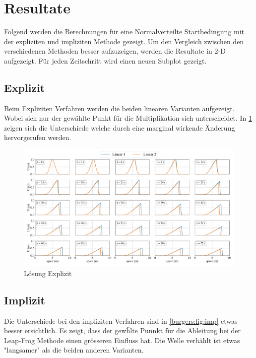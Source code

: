 %
%
\section{Resultate
\label{burgers:section:results}}

	Folgend werden die Berechnungen f\"ur eine Normalverteilte Startbedingung mit der expliziten und impliziten Methode gezeigt.
	Um den Vergleich zwischen den verschiedenen Methoden besser aufzuzeigen, werden die Resultate in 2-D aufgezeigt.
	F\"ur jeden Zeitschritt wird einen neuen Subplot gezeigt.
	
	\subsection{Explizit}

	Beim Expliziten Verfahren werden die beiden linearen Varianten aufgezeigt.
	Wobei sich nur der gew\"ahlte Punkt f\"ur die Multiplikation sich unterscheidet.
	In \ref{burgers:fig:ex} zeigen sich die Unterschiede welche durch eine marginal wirkende \"Anderung hervorgerufen werden.
	

    \begin{figure}
	\centering
	\includegraphics[width=1\textwidth]{papers/burgers/BurgersEquation/lin_paper.pdf}
	\caption{L\"osung Explizit}
	\label{burgers:fig:ex}
	\end{figure}
	
	\subsection{Implizit}

	Die Unterschiede bei den impliziten Verfahren sind in \ref{burgers:fig:imp} etwas besser ersichtlich.
	Es zeigt, dass der gew\"hlte Punnkt f\"ur die Ableitung bei der Leap-Frog Methode einen gr\"osseren Einfluss hat.
	Die Welle verh\"ahlt ist etwas "langsamer" als die beiden anderen Varianten.

